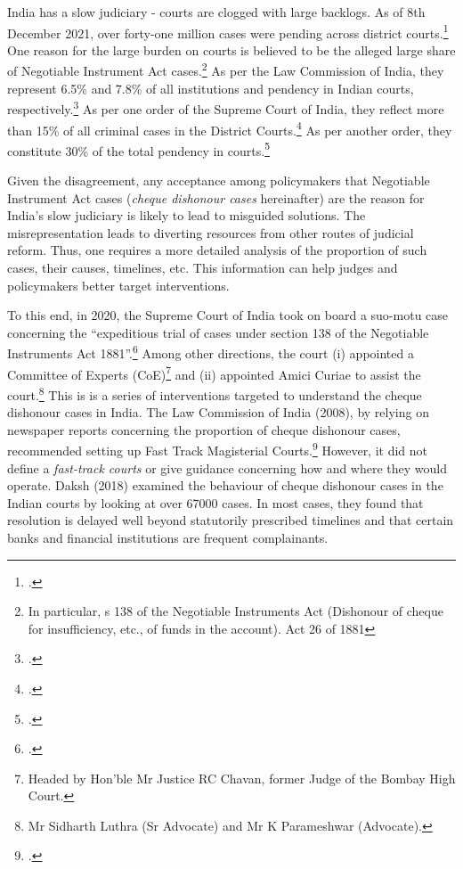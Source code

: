India has a slow judiciary - courts are clogged with large backlogs. As of 8th December 2021, over forty-one million cases were pending across district courts.\footcite{njdg2021} One reason for the large burden on courts is believed to be the alleged large share of Negotiable Instrument Act cases.\footnote{In particular, s 138 of the Negotiable Instruments Act (Dishonour of cheque for insufficiency, etc., of funds in the account). Act 26 of 1881} As per the Law Commission of India, they represent 6.5\% and 7.8\% of all institutions and pendency in Indian courts, respectively.\footcite{lci2014_arrears} As per one order of the Supreme Court of India, they reflect more than 15\% of all criminal cases in the District Courts.\footcite{sc2020_makwanavstate} As per another order, they constitute 30\% of the total pendency in courts.\footcite{sc2020_138}

Given the disagreement, any acceptance among policymakers that Negotiable Instrument Act cases (\textit{cheque dishonour cases} hereinafter) are the reason for India's slow judiciary is likely to lead to misguided solutions. The misrepresentation leads to diverting resources from other routes of judicial reform. Thus, one requires a more detailed analysis of the proportion of such cases, their causes, timelines, etc. This information can help judges and policymakers better target interventions.

To this end, in 2020, the Supreme Court of India took on board a suo-motu case concerning the “expeditious trial of cases under section 138 of the Negotiable Instruments Act 1881”.\footcite{sc2020_138} Among other directions, the court (i) appointed a Committee of Experts (CoE)\footnote{Headed by Hon’ble Mr Justice RC Chavan, former Judge of the Bombay High Court.} and (ii) appointed Amici Curiae to assist the court.\footnote{Mr Sidharth Luthra (Sr Advocate) and Mr K Parameshwar (Advocate).} This is is a series of interventions targeted to understand the cheque dishonour cases in India. The Law Commission of India (2008), by relying on newspaper reports concerning the proportion of cheque dishonour cases, recommended setting up Fast Track Magisterial Courts.\footcite{lci2008_138, bhan2015_placing} However, it did not define a \textit{fast-track courts} or give guidance concerning how and where they would operate. Daksh (2018) examined the behaviour of cheque dishonour cases in the Indian courts by looking at over 67000 cases. In most cases, they found that resolution is delayed well beyond statutorily prescribed timelines and that certain banks and financial institutions are frequent complainants.

